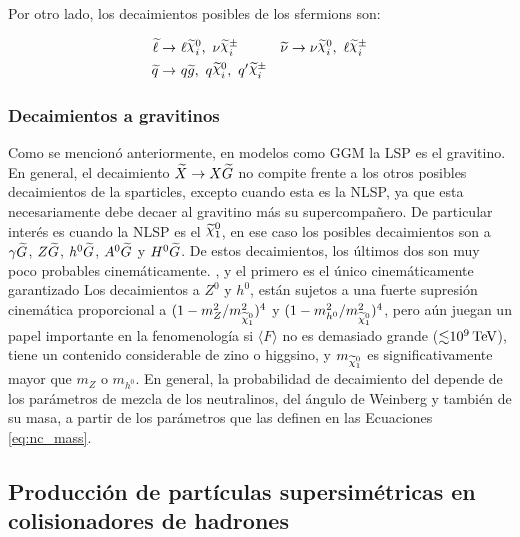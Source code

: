 Por otro lado, los decaimientos posibles de los sfermions son:

\begin{equation}
	\begin{split}
		\slepton \to &\ \ell\ggino^0_i,\ \nu\ggino^\pm_i \quad\quad\quad \snu\to \nu\ggino^0_i,\ \ell\ggino^\pm_i \\
		\squark\to &\ q\gluino,\ q\ggino^0_i,\ q'\ggino^\pm_i
	\end{split}
\end{equation}

\subsubsection{Decaimientos a gravitinos}

Como se mencionó anteriormente, en modelos como GGM la LSP es el gravitino. En general, el decaimiento $\widetilde{X} \to X\widetilde{G}$ no compite frente a los otros posibles decaimientos de la sparticles, excepto cuando esta es la NLSP, ya que esta necesariamente debe decaer al gravitino más su supercompañero. De particular interés es cuando la NLSP es el $\ninoone$, en ese caso los posibles decaimientos son a $\gamma\widetilde{G}$, $Z\widetilde{G}$, $h^0\widetilde{G}$, $A^0\widetilde{G}$ y $H^0\widetilde{G}$. De estos decaimientos, los últimos dos son muy poco probables cinemáticamente.
, y el primero es el único cinemáticamente garantizado 
Los decaimientos a $Z^0$ y $h^0$, están sujetos a una fuerte supresión cinemática proporcional a $ (1-m_{Z}^{2}/m_{\ninoone}^{2})^4$ y $(1-m_{h^{0}}^{2}/m_{\ninoone}^{2})^4$, pero aún juegan un papel importante en la fenomenología si $ \langle F \rangle $ no es demasiado grande (${\lesssim}10^9\,\text{TeV}$), \ninoone tiene un contenido considerable de zino o higgsino, y $m_{\ninoone}$ es significativamente mayor que $m_{Z}$ o $m_{h^{0}}$. 
En general, la probabilidad de decaimiento del \ninoone depende de los parámetros de mezcla de los neutralinos, del ángulo de Weinberg y también de su masa, a partir de los parámetros que las definen en las Ecuaciones \ref{eq:nc_mass}.

\subsection{Producción de partículas supersimétricas en colisionadores de hadrones}

